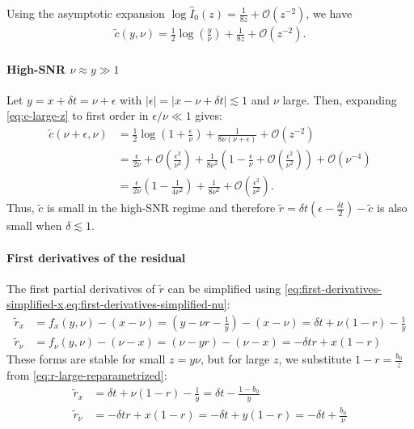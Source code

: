 \documentclass{article}
\begin{document}
Using the asymptotic expansion $\log \hat{I}_0(z) = \frac{1}{8z} + \mathcal{O}(z^{-2})$, we have
%
\begin{align}\label{eq:c-large-z}
  \tilde{c}(y,\nu) = \frac{1}{2}\log\left(\frac{y}{\nu}\right) + \frac{1}{8z} + \mathcal{O}(z^{-2}).
\end{align}

\paragraph{High-SNR $\nu \approx y \gg 1$}

Let $y = x + \delta t = \nu + \epsilon$ with $|\epsilon| = |x - \nu + \delta t| \lesssim 1$ and $\nu$ large.
Then, expanding \cref{eq:c-large-z} to first order in $\epsilon/\nu \ll 1$ gives:
%
\begin{align}
  \tilde{c}(\nu+\epsilon, \nu) & = \frac{1}{2}\log\left(1 + \frac{\epsilon}{\nu}\right) + \frac{1}{8\nu(\nu+\epsilon)} + \mathcal{O}(z^{-2})                                                                                                   \\
                               & = \frac{\epsilon}{2\nu} + \mathcal{O}\left(\frac{\epsilon^2}{\nu^2}\right) + \frac{1}{8\nu^2}\left(1 - \frac{\epsilon}{\nu} + \mathcal{O}\left(\frac{\epsilon^2}{\nu^2}\right)\right) + \mathcal{O}(\nu^{-4}) \\
                               & = \frac{\epsilon}{2\nu}\left(1 - \frac{1}{4\nu^2}\right) + \frac{1}{8\nu^2} + \mathcal{O}\left(\frac{\epsilon^2}{\nu^2}\right).
\end{align}
%
Thus, $\tilde{c}$ is small in the high-SNR regime and therefore $\tilde{r} = \delta t (\epsilon - \frac{\delta t}{2}) - \tilde{c}$ is also small when $\delta \lesssim 1$.

\paragraph{First derivatives of the residual}\label{sec:first-derivatives-residual}

The first partial derivatives of $\tilde{r}$ can be simplified using \cref{eq:first-derivatives-simplified-x,eq:first-derivatives-simplified-nu}:
%
\begin{align}
  \tilde{r}_x   & = f_x(y,\nu) - (x-\nu) = (y - \nu r - \frac{1}{y}) - (x-\nu) = \delta t + \nu (1 - r) - \frac{1}{y} \\
  \tilde{r}_\nu & = f_\nu(y,\nu) - (\nu-x) = (\nu - y r) - (\nu-x) = -\delta t r + x (1 - r)
\end{align}
%
These forms are stable for small $z = y \nu$, but for large $z$, we substitute $1-r = \frac{b_0}{z}$ from \cref{eq:r-large-reparametrized}:
%
\begin{align}
  \tilde{r}_x   & = \delta t + \nu (1 - r) - \frac{1}{y} = \delta t - \frac{1 - b_0}{y}           \\
  \tilde{r}_\nu & = -\delta t r + x (1 - r) = -\delta t + y (1 - r) = -\delta t + \frac{b_0}{\nu}
\end{align}
\end{document}
